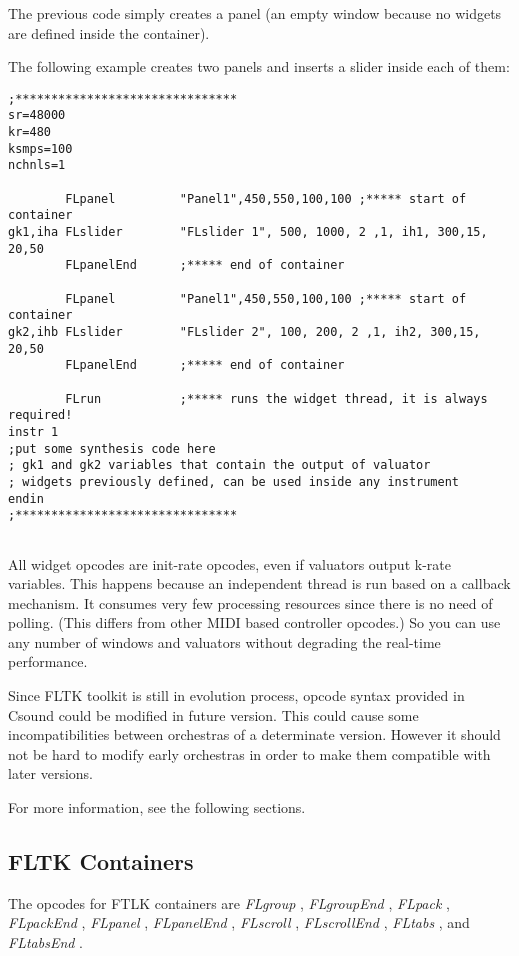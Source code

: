  
 The previous code simply creates a panel (an empty window because no widgets are defined inside the container). 

  The following example creates two panels and inserts a slider inside each of them: 


 
\begin{lstlisting}
;*******************************
sr=48000
kr=480
ksmps=100
nchnls=1

        FLpanel         "Panel1",450,550,100,100 ;***** start of container
gk1,iha FLslider        "FLslider 1", 500, 1000, 2 ,1, ih1, 300,15, 20,50
        FLpanelEnd      ;***** end of container

        FLpanel         "Panel1",450,550,100,100 ;***** start of container
gk2,ihb FLslider        "FLslider 2", 100, 200, 2 ,1, ih2, 300,15, 20,50
        FLpanelEnd      ;***** end of container

        FLrun           ;***** runs the widget thread, it is always required!
instr 1
;put some synthesis code here
; gk1 and gk2 variables that contain the output of valuator
; widgets previously defined, can be used inside any instrument
endin
;*******************************
      
\end{lstlisting}


 


  All widget opcodes are init-rate opcodes, even if valuators output k-rate variables. This happens because an independent thread is run based on a callback mechanism. It consumes very few processing resources since there is no need of polling. (This differs from other MIDI based controller opcodes.) So you can use any number of windows and valuators without degrading the real-time performance. 


  Since FLTK toolkit is still in evolution process, opcode syntax provided in Csound could be modified in future version. This could cause some incompatibilities between orchestras of a determinate version. However it should not be hard to modify early orchestras in order to make them compatible with later versions. 


  For more information, see the following sections. 
\subsection*{FLTK Containers}


  The opcodes for FTLK containers are \emph{FLgroup}
, \emph{FLgroupEnd}
, \emph{FLpack}
, \emph{FLpackEnd}
, \emph{FLpanel}
, \emph{FLpanelEnd}
, \emph{FLscroll}
, \emph{FLscrollEnd}
, \emph{FLtabs}
, and \emph{FLtabsEnd}
. 
